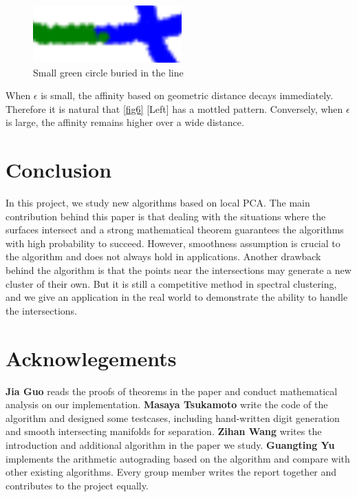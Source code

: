 \documentclass{article}
\begin{document}
\begin{figure}[htbp]
\centering
\includegraphics[width=0.22  \textwidth]{boundary.png}
\vspace{-1em}
\caption{Small green circle buried in the line}
\label{fig7}
\end{figure}

When $\epsilon$ is small, the affinity based on geometric distance decays immediately.
Therefore it is natural that \autoref{fig6} [Left] has a mottled pattern.
Conversely, when $\epsilon$ is large, the affinity remains higher over a wide distance.



\section{Conclusion}
In this project, we study new algorithms based on local PCA.
The main contribution behind this paper is that dealing with the situations where the surfaces intersect and a strong mathematical theorem guarantees the algorithms with high probability to succeed.
However, smoothness assumption is crucial to the algorithm and does not always hold in applications.
Another drawback behind the algorithm is that the points near the intersections may generate a new cluster of their own.
But it is still a competitive method in spectral clustering, and we give an application in the real world to demonstrate the ability to handle the intersections.

                


\section{Acknowlegements}
\textbf{Jia Guo} reads the proofs of theorems in the paper and conduct mathematical analysis on our implementation.
\textbf{Masaya Tsukamoto} write the code of the algorithm and designed some testcases, including hand-written digit generation and smooth intersecting manifolds for separation.
\textbf{Zihan Wang} writes the introduction and additional algorithm in the paper we study.
\textbf{Guangting Yu} implements the arithmetic autograding based on the algorithm and compare with other existing algorithms.
Every group member writes the report together and contributes to the project equally.

\medskip
\small

% 
% 


\end{document}
